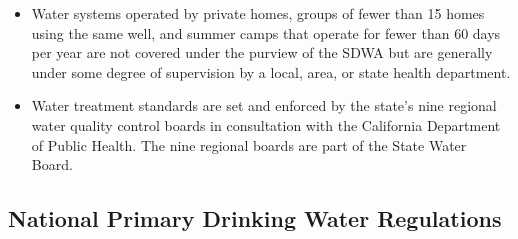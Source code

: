 \begin{itemize}
\item Water systems operated by private homes, groups of fewer than 15 homes using the same well, and summer camps that operate for fewer than 60 days per year are not covered under the purview of the SDWA but are generally under some degree of supervision by a local, area, or state health department.
\item Water treatment standards are set and enforced by the state’s nine regional water quality control boards in consultation with the California Department of Public Health. The nine regional boards are part of the State Water Board.
\end{itemize}

\subsection{National Primary Drinking Water Regulations}
